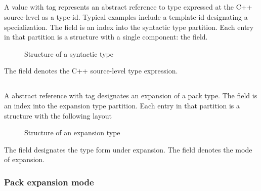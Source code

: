 
\subsection{}
\label{sec:ifc:TypeSort:Syntactic}

A  value with tag  represents
an abstract reference to type expressed at the C++ source-level as a type-id.
Typical examples include a template-id designating a specialization.
The  field is an index into the syntactic type partition.
Each entry in that partition is a structure with a single component: the  field.
%
\begin{figure}[H]
	\centering
	\caption{Structure of a syntactic type}
	\label{fig:ifc-syntactic-type-structure}
\end{figure}
%
The  field denotes the C++ source-level type expression.


\subsection{}
\label{sec:ifc:TypeSort:Expansion}

A  abstract reference with tag  designates
an expansion of a pack type.  The  field is an index into the expansion
type partition.  Each entry in that partition is a structure with the following layout
%
\begin{figure}[H]
	\centering
	\caption{Structure of an expansion type}
	\label{fig:fic-expansion-type-structure}
\end{figure}
%
The  field designates the type form under expansion.
The  field denotes the mode of expansion.


\subsubsection{Pack expansion mode}
\label{sec:ifc-pack-expansion-mode}

